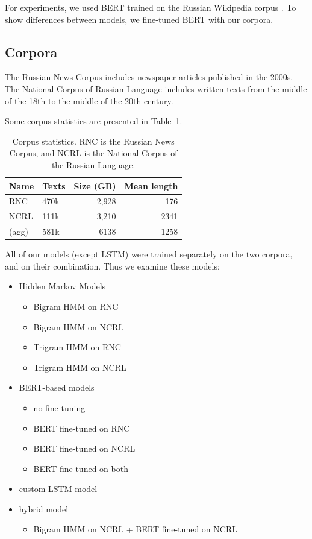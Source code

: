 \documentclass[a4paper]{article}
\begin{document}
For experiments, we used BERT trained on the Russian Wikipedia corpus
\cite{ruwiki}. To show differences between models, we fine-tuned BERT with our corpora.


\subsection{Corpora}

The Russian News Corpus \cite{runews} includes newspaper articles published in the 2000s.
The National Corpus of Russian Language \cite{natcorp} includes written texts from the middle of the 18th to the middle of the 20th century.

Some corpus statistics are presented in Table~\ref{tbl:corpus}.

\begin{table}
\label{tbl:corpus}
\caption{Corpus statistics. RNC is the Russian News Corpus, and NCRL is the National Corpus of the Russian Language.
\newline}
\centering

\begin{tabular}{llrr}
\textbf{Name}&
\textbf{Texts} &
\textbf{Size} (GB)&
\textbf{Mean length}\\
\hline
RNC &
470k&
2,928&
176\\
NCRL &
111k &
3,210 &
2341 \\
(agg) &
581k &
6138 &
1258
\end{tabular}
\end{table}


All of our models (except LSTM) were trained separately on the two corpora, and on their combination. Thus we examine these models:

\begin{itemize}
	\item Hidden Markov Models
	\begin{itemize}
		\item Bigram HMM on RNC
		\item Bigram HMM on NCRL
		\item Trigram HMM on RNC
		\item Trigram HMM on NCRL
	\end{itemize}
	\item BERT-based models

	\begin{itemize}
		\item no fine-tuning
		\item BERT fine-tuned on RNC
		\item BERT fine-tuned on NCRL
		\item BERT fine-tuned on both
	\end{itemize}

	\item custom LSTM model
	\item hybrid model
	\begin{itemize}
		\item Bigram HMM on NCRL + BERT fine-tuned on NCRL
	\end{itemize}
\end{itemize}
\end{document}
